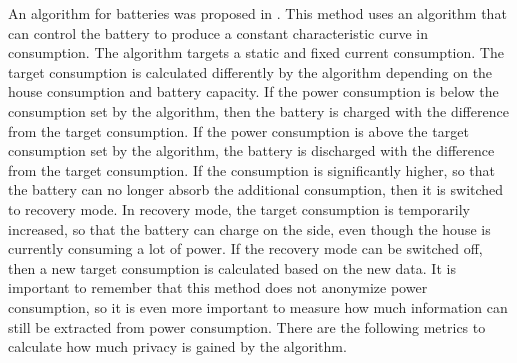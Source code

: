 An algorithm for batteries was proposed in \cite{mclaughlin2011protecting}. This method uses an algorithm that can control the battery to produce a constant characteristic curve in consumption. The algorithm targets a static and fixed current consumption. The target consumption is calculated differently by the algorithm depending on the house consumption and battery capacity. If the power consumption is below the consumption set by the algorithm, then the battery is charged with the difference from the target consumption. If the power consumption is above the target consumption set by the algorithm, the battery is discharged with the difference from the target consumption. If the consumption is significantly higher, so that the battery can no longer absorb the additional consumption, then it is switched to recovery mode. In recovery mode, the target consumption is temporarily increased, so that the battery can charge on the side, even though the house is currently consuming a lot of power. If the recovery mode can be switched off, then a new target consumption is calculated based on the new data. It is important to remember that this method does not anonymize power consumption, so it is even more important to measure how much information can still be extracted from power consumption. There are the following metrics to calculate how much privacy is gained by the algorithm.
